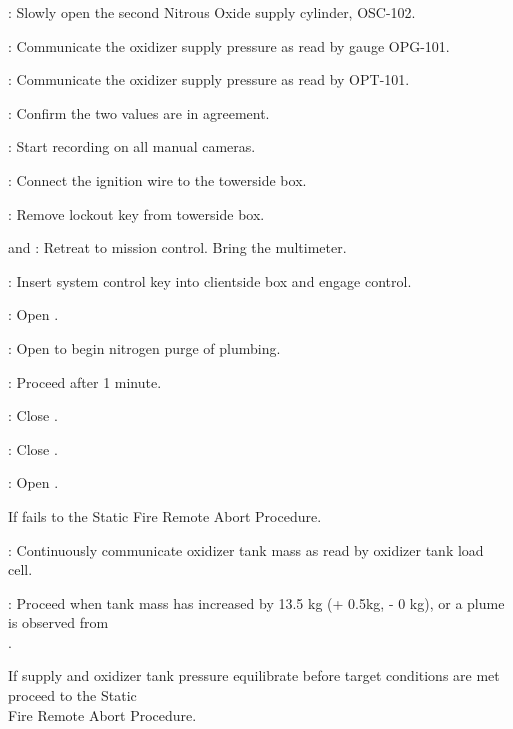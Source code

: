 \begin{checklist}
\begin{checklist}[label=$\bullet$]
    \end{checklist}
    \item \primary{}: Slowly open the second Nitrous Oxide supply cylinder, OSC-102. 
    \item \primary{}: Communicate the oxidizer supply pressure as read by gauge OPG-101.
    \item \daq{}: Communicate the oxidizer supply pressure as read by OPT-101.
    \item \ops{}: Confirm the two values are in agreement. 
    \item \primary{}: Start recording on all manual cameras. 
    \item \secondary{}: Connect the ignition wire to the towerside box. 
    \item \secondary{}: Remove lockout key from towerside box. 
    \item \primary{} and \secondary{}: Retreat to mission control. Bring the multimeter.  
    \item \rlcs{}: Insert system control key into clientside box and engage control.
    \item \rlcs{}: Open \oxdrain{}.
    \item \rlcs{}: Open \purge{} to begin nitrogen purge of plumbing.
    \item \ops{}: Proceed after 1 minute.
    \item \rlcs{}: Close \oxdrain{}.
    \item \rlcs{}: Close \purge{}.
    \item \rlcs{}: Open \oxfill{}.
    \begin{checklist}[label=$\bullet$]
        \item If \oxfill{} fails to the Static Fire Remote Abort Procedure.
    \end{checklist}
    \item \daq{}: Continuously communicate oxidizer tank mass as read by oxidizer tank load cell. 
    \item \ops{}: Proceed when tank mass has increased by 13.5 kg (+ 0.5kg, - 0 kg), or a plume is observed from  \\ \phantom{} \hspace{3ex} \vent{}. 
    \begin{checklist}[label=$\bullet$]
        \item If supply and oxidizer tank pressure equilibrate before target conditions are met proceed to the Static \\ \phantom{} \hspace{8ex} Fire Remote Abort Procedure.

\end{checklist}
\end{checklist}
